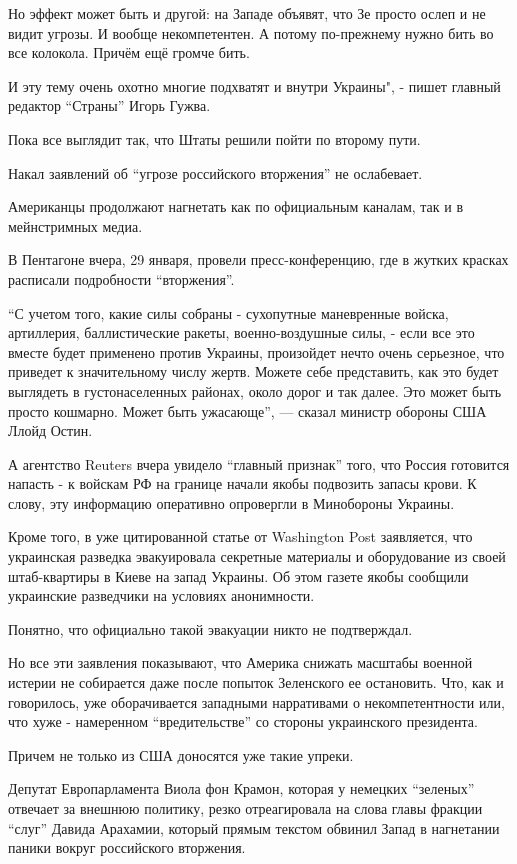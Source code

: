 Но эффект может быть и другой: на Западе объявят, что Зе просто ослеп и не
видит угрозы. И вообще некомпетентен. А потому по-прежнему нужно бить во все
колокола. Причём ещё громче бить.

И эту тему очень охотно многие подхватят и внутри Украины", - пишет главный
редактор \enquote{Страны} Игорь Гужва.

Пока все выглядит так, что Штаты решили пойти по второму пути.

Накал заявлений об \enquote{угрозе российского вторжения} не ослабевает.

Американцы продолжают нагнетать как по официальным каналам, так и в мейнстримных медиа.

В Пентагоне вчера, 29 января, провели пресс-конференцию, где в жутких красках
расписали подробности \enquote{вторжения}. 

\enquote{С учетом того, какие силы собраны - сухопутные маневренные войска,
артиллерия, баллистические ракеты, военно-воздушные силы, - если все это вместе
будет применено против Украины, произойдет нечто очень серьезное, что приведет
к значительному числу жертв. Можете себе представить, как это будет выглядеть в
густонаселенных районах, около дорог и так далее. Это может быть просто
кошмарно. Может быть ужасающе}, — сказал министр обороны США Ллойд Остин.

А агентство Reuters вчера увидело \enquote{главный признак} того, что Россия
готовится напасть - к войскам РФ на границе начали якобы подвозить запасы
крови. К слову, эту информацию оперативно опровергли в Минобороны Украины.

Кроме того, в уже цитированной статье от Washington Post заявляется, что
украинская разведка эвакуировала секретные материалы и оборудование из своей
штаб-квартиры в Киеве на запад Украины. Об этом газете якобы сообщили
украинские разведчики на условиях анонимности.

Понятно, что официально такой эвакуации никто не подтверждал.

Но все эти заявления показывают, что Америка снижать масштабы военной истерии
не собирается даже после попыток Зеленского ее остановить. Что, как и
говорилось, уже оборачивается западными нарративами о некомпетентности или, что
хуже - намеренном \enquote{вредительстве} со стороны украинского президента. 

Причем не только из США доносятся уже такие упреки.

Депутат Европарламента Виола фон Крамон, которая у немецких \enquote{зеленых} отвечает
за внешнюю политику, резко отреагировала на слова главы фракции \enquote{слуг} Давида
Арахамии, который прямым текстом обвинил Запад в нагнетании паники вокруг
российского вторжения.

